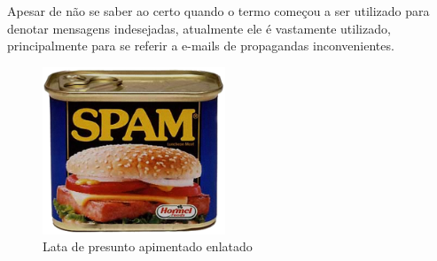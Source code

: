 \documentclass[a4paper,dvipdfm]{article}
\begin{document}
		Apesar de não se saber ao certo quando o termo começou a ser utilizado para denotar mensagens indesejadas, atualmente ele é vastamente utilizado, principalmente para  se referir a e-mails de propagandas inconvenientes.
		
		\begin{figure}[ht]
			\centering
			\includegraphics [height=5cm]{Imagens/spam/spam.png}
			\caption{Lata de presunto apimentado enlatado}
			\label{fig:spam}
		\end{figure}
\end{document}

